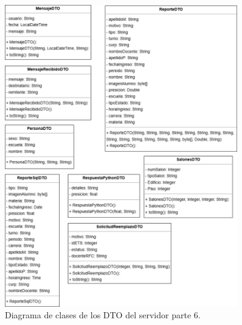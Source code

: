 \begin{figure}[htbp!]
	\begin{center}
		\includegraphics[width=0.9\textwidth]{Clases/DTO6.png}
		\caption{Diagrama de clases de los DTO del servidor parte 6.}
		\label{fig:DTO6}
	\end{center}
\end{figure}